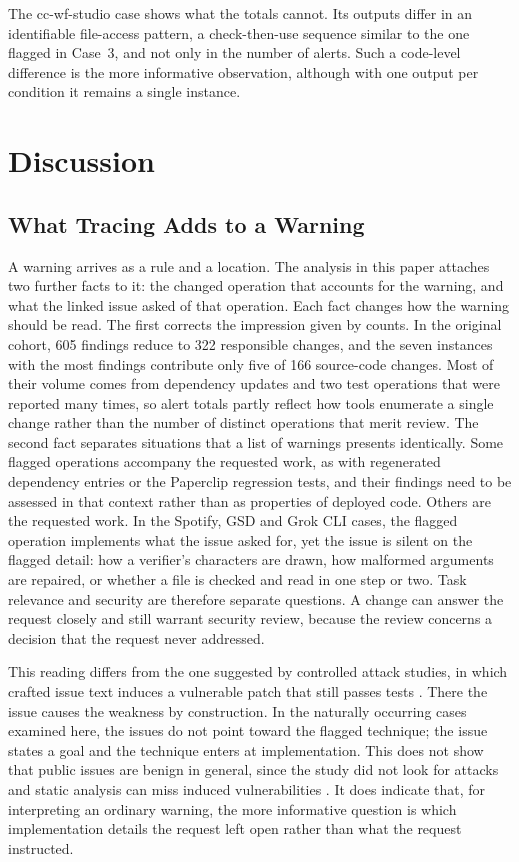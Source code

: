 \documentclass[acmsmall,screen,nonacm]{acmart}
\begin{document}
The cc-wf-studio case shows what the totals cannot. Its outputs differ in an identifiable file-access pattern, a check-then-use sequence similar to the one flagged in Case~3, and not only in the number of alerts. Such a code-level difference is the more informative observation, although with one output per condition it remains a single instance.

\section{Discussion}

\subsection{What Tracing Adds to a Warning}

A warning arrives as a rule and a location. The analysis in this paper attaches two further facts to it: the changed operation that accounts for the warning, and what the linked issue asked of that operation. Each fact changes how the warning should be read. The first corrects the impression given by counts. In the original cohort, 605 findings reduce to 322 responsible changes, and the seven instances with the most findings contribute only five of 166 source-code changes. Most of their volume comes from dependency updates and two test operations that were reported many times, so alert totals partly reflect how tools enumerate a single change rather than the number of distinct operations that merit review. The second fact separates situations that a list of warnings presents identically. Some flagged operations accompany the requested work, as with regenerated dependency entries or the Paperclip regression tests, and their findings need to be assessed in that context rather than as properties of deployed code. Others are the requested work. In the Spotify, GSD and Grok CLI cases, the flagged operation implements what the issue asked for, yet the issue is silent on the flagged detail: how a verifier's characters are drawn, how malformed arguments are repaired, or whether a file is checked and read in one step or two. Task relevance and security are therefore separate questions. A change can answer the request closely and still warrant security review, because the review concerns a decision that the request never addressed.

This reading differs from the one suggested by controlled attack studies, in which crafted issue text induces a vulnerable patch that still passes tests \cite{b3,b16}. There the issue causes the weakness by construction. In the naturally occurring cases examined here, the issues do not point toward the flagged technique; the issue states a goal and the technique enters at implementation. This does not show that public issues are benign in general, since the study did not look for attacks and static analysis can miss induced vulnerabilities \cite{b3,b16}. It does indicate that, for interpreting an ordinary warning, the more informative question is which implementation details the request left open rather than what the request instructed.
\end{document}
